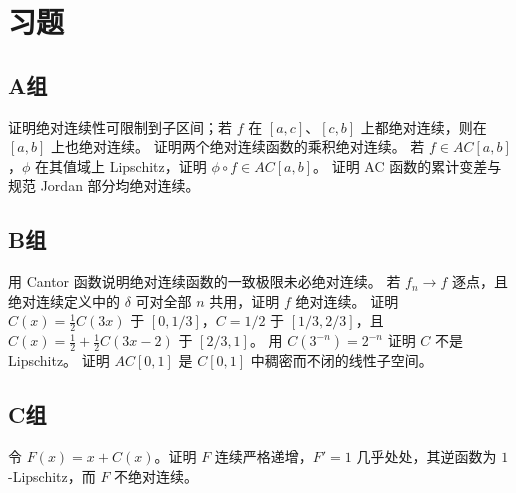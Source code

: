 \section*{习题}
\subsection*{A组}
\begin{enumerate}[label=\textbf{\thechapter.\arabic*.}]
证明绝对连续性可限制到子区间；若 \(f\) 在 \([a,c]\)、\([c,b]\) 上都绝对连续，则在 \([a,b]\) 上也绝对连续。
证明两个绝对连续函数的乘积绝对连续。
若 \(f\in AC[a,b]\)，\(\phi\) 在其值域上 Lipschitz，证明 \(\phi\circ f\in AC[a,b]\)。
证明 AC 函数的累计变差与规范 Jordan 部分均绝对连续。
\end{enumerate}
\subsection*{B组}
\begin{enumerate}[label=\textbf{\thechapter.\arabic*.},resume]
用 Cantor 函数说明绝对连续函数的一致极限未必绝对连续。
若 \(f_n\to f\) 逐点，且绝对连续定义中的 \(\delta\) 可对全部 \(n\) 共用，证明 \(f\) 绝对连续。
证明 \(C(x)=\frac12C(3x)\) 于 \([0,1/3]\)，\(C=1/2\) 于 \([1/3,2/3]\)，且 \(C(x)=\frac12+\frac12C(3x-2)\) 于 \([2/3,1]\)。
用 \(C(3^{-n})=2^{-n}\) 证明 \(C\) 不是 Lipschitz。
证明 \(AC[0,1]\) 是 \(C[0,1]\) 中稠密而不闭的线性子空间。
\end{enumerate}
\subsection*{C组}
\begin{enumerate}[label=\textbf{\thechapter.\arabic*.},resume]
令 \(F(x)=x+C(x)\)。证明 \(F\) 连续严格递增，\(F'=1\) 几乎处处，其逆函数为 \(1\)-Lipschitz，而 \(F\) 不绝对连续。
\end{enumerate}
